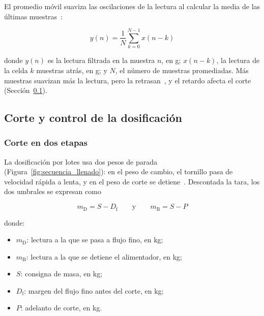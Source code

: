 El promedio móvil suaviza las oscilaciones de la lectura al calcular la
media de las últimas muestras~\parencite{zengin2025fir}:

\begin{equation}
    y(n) = \frac{1}{N} \sum_{k=0}^{N-1} x(n-k)
    \label{eq:promedio_movil}
\end{equation}

\noindent donde $y(n)$ es la lectura filtrada en la muestra $n$, en g;
$x(n-k)$, la lectura de la celda $k$ muestras atrás, en g; y $N$, el número de
muestras promediadas. Más muestras suavizan más la lectura, pero la
retrasan~\parencite{zengin2025fir}, y el retardo afecta el corte
(Sección~\ref{subsec:fund_control}).

\subsection{Corte y control de la dosificación}
\label{subsec:fund_control}


\subsubsection{Corte en dos etapas}
\label{subsubsec:fund_dos_etapas}

La dosificación por lotes usa dos pesos de parada
(Figura~\ref{fig:secuencia_llenado}): en el peso de cambio, el tornillo pasa de
velocidad rápida a lenta, y en el peso de corte se
detiene~\parencite{sanchez2024tolvas,bulatov2021dosing}. Descontada la tara, los
dos umbrales se expresan como~\parencite{sanchez2024tolvas}

\begin{equation}
    m_{\mathrm{D}} = S - D_{\mathrm{f}}
    \qquad \text{y} \qquad
    m_{\mathrm{B}} = S - P
    \label{eq:corte_dos_etapas}
\end{equation}

\noindent donde:

\begin{itemize}[nosep, label={}, leftmargin=1.5em]
    \item $m_{\mathrm{D}}$: lectura a la que se pasa a flujo fino, en kg;
    \item $m_{\mathrm{B}}$: lectura a la que se detiene el alimentador, en kg;
    \item $S$: consigna de masa, en kg;
    \item $D_{\mathrm{f}}$: margen del flujo fino antes del corte, en kg;
    \item $P$: adelanto de corte, en kg.
\end{itemize}


